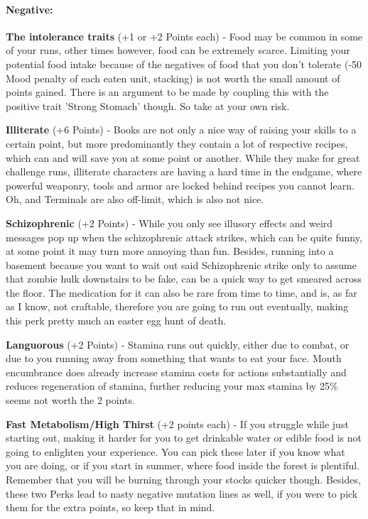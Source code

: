 \documentclass[11pt]{report}
\begin{document}
\paragraph{Negative:}

\textbf{The intolerance traits} (+1 or +2 Points each) - Food may be common in some of your runs, other times however, food can be extremely scarce. Limiting your potential food intake because of the negatives of food that you don't tolerate (-50 Mood penalty of each eaten unit, stacking) is not worth the small amount of points gained. There is an argument to be made by coupling this with the positive trait 'Strong Stomach' though. So take at your own risk.

\textbf{Illiterate} (+6 Points) - Books are not only a nice way of raising your skills to a certain point, but more predominantly they contain a lot of respective recipes, which can and will save you at some point or another. While they make for great challenge runs, illiterate characters are having a hard time in the endgame, where powerful weaponry, tools and armor are locked behind recipes you cannot learn. Oh, and Terminals are also off-limit, which is also not nice.

\textbf{Schizophrenic} (+2 Points) - While you only see illusory effects and weird messages pop up when the schizophrenic attack strikes, which can be quite funny, at some point it may turn more annoying than fun. Besides, running into a basement because you want to wait out said Schizophrenic strike only to assume that zombie hulk downstairs to be fake, can be a quick way to get smeared across the floor. The medication for it can also be rare from time to time, and is, as far as I know, not craftable, therefore you are going to run out eventually, making this perk pretty much an easter egg hunt of death.

\textbf{Languorous} (+2 Points) - Stamina runs out quickly, either due to combat, or due to you running away from something that wants to eat your face. Mouth encumbrance does already increase stamina costs for actions substantially and reduces regeneration of stamina, further reducing your max stamina by 25\% seems not worth the 2 points.

\textbf{Fast Metabolism/High Thirst} (+2 points each) - If you struggle while just starting out, making it harder for you to get drinkable water or edible food is not going to enlighten your experience. You can pick these later if you know what you are doing, or if you start in summer, where food inside the forest is plentiful. Remember that you will be burning through your stocks quicker though.
Besides, these two Perks lead to nasty negative mutation lines as well, if you were to pick them for the extra points, so keep that in mind.
\end{document}
